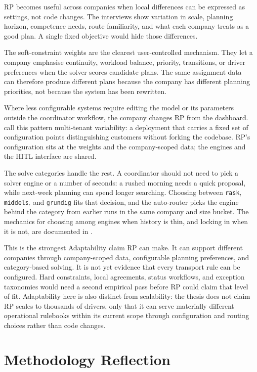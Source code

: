 RP becomes useful across companies when local differences can be expressed as settings, not code changes. The interviews show variation in scale, planning horizon, competence needs, route familiarity, and what each company treats as a good plan. A single fixed objective would hide those differences.

The soft-constraint weights are the clearest user-controlled mechanism. They let a company emphasise continuity, workload balance, priority, transitions, or driver preferences when the solver scores candidate plans. The same assignment data can therefore produce different plans because the company has different planning priorities, not because the system has been rewritten.

Where less configurable systems require editing the model or its parameters outside the coordinator workflow, the company changes RP from the dashboard. \textcite{mietzner2009variability} call this pattern multi-tenant variability: a deployment that carries a fixed set of configuration points distinguishing customers without forking the codebase. RP's configuration sits at the weights and the company-scoped data; the engines and the HITL interface are shared.

The solve categories handle the rest. A coordinator should not need to pick a solver engine or a number of seconds: a rushed morning needs a quick proposal, while next-week planning can spend longer searching. Choosing between \texttt{rask}, \texttt{middels}, and \texttt{grundig} fits that decision, and the auto-router picks the engine behind the category from earlier runs in the same company and size bucket. The mechanics for choosing among engines when history is thin, and locking in when it is not, are documented in .

This is the strongest Adaptability claim RP can make. It can support different companies through company-scoped data, configurable planning preferences, and category-based solving. It is not yet evidence that every transport rule can be configured. Hard constraints, local agreements, status workflows, and exception taxonomies would need a second empirical pass before RP could claim that level of fit. Adaptability here is also distinct from scalability: the thesis does not claim RP scales to thousands of drivers, only that it can serve materially different operational rulebooks within its current scope through configuration and routing choices rather than code changes.


\section{Methodology Reflection}
\label{sec:methodology-reflection}

